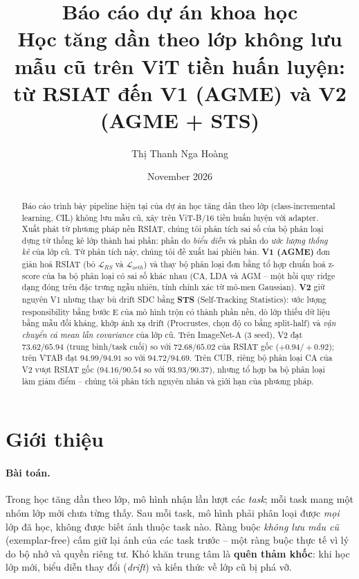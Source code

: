 \documentclass[11pt]{article}
\title{Báo cáo dự án khoa học\\[4pt]
\large Học tăng dần theo lớp không lưu mẫu cũ trên ViT tiền huấn luyện:\\
từ RSIAT đến V1 (AGME) và V2 (AGME + STS)}
\author{Thị Thanh Nga Hoàng}
\date{November 2026}
\begin{document}
\maketitle

\begin{abstract}
Báo cáo trình bày pipeline hiện tại của dự án học tăng dần theo lớp (class-incremental learning, CIL) không lưu mẫu
cũ, xây trên ViT-B/16 tiền huấn luyện với adapter. Xuất phát từ phương pháp nền RSIAT, chúng tôi phân tích sai số của
bộ phân loại dựng từ thống kê lớp thành hai phần: phần do \emph{biểu diễn} và phần do \emph{ước lượng thống kê} của lớp
cũ. Từ phân tích này, chúng tôi đề xuất hai phiên bản. \textbf{V1 (AGME)} đơn giản hoá RSIAT (bỏ $\mathcal{L}_{RS}$ và
$\mathcal{L}_{orth}$) và thay bộ phân loại đơn bằng tổ hợp chuẩn hoá z-score của ba bộ phân loại có sai số khác nhau
(CA, LDA và AGM -- một hồi quy ridge dạng đóng trên đặc trưng ngẫu nhiên, tính chính xác từ mô-men Gaussian).
\textbf{V2} giữ nguyên V1 nhưng thay bù drift SDC bằng \textbf{STS} (Self-Tracking Statistics): ước lượng
responsibility bằng bước E của mô hình trộn có thành phần nền, dò lớp thiếu dữ liệu bằng mẫu đối kháng, khớp ánh xạ
drift (Procrustes, chọn độ co bằng split-half) và \emph{vận chuyển cả mean lẫn covariance} của lớp cũ. Trên
ImageNet-A (3 seed), V2 đạt $73.62/65.94$ (trung bình/task cuối) so với $72.68/65.02$ của RSIAT gốc
($+0.94/+0.92$); trên VTAB đạt $94.99/94.91$ so với $94.72/94.69$. Trên CUB, riêng bộ phân loại CA của V2 vượt RSIAT
gốc ($94.16/90.54$ so với $93.93/90.37$), nhưng tổ hợp ba bộ phân loại làm giảm điểm -- chúng tôi phân tích nguyên
nhân và giới hạn của phương pháp.
\end{abstract}

\tableofcontents
\newpage

\section{Giới thiệu}

\paragraph{Bài toán.} Trong học tăng dần theo lớp, mô hình nhận lần lượt các \emph{task}; mỗi task mang một nhóm lớp
mới chưa từng thấy. Sau mỗi task, mô hình phải phân loại được \emph{mọi} lớp đã học, không được biết ảnh thuộc task
nào. Ràng buộc \emph{không lưu mẫu cũ} (exemplar-free) cấm giữ lại ảnh của các task trước -- một ràng buộc thực tế vì
lý do bộ nhớ và quyền riêng tư. Khó khăn trung tâm là \textbf{quên thảm khốc}: khi học lớp mới, biểu diễn thay đổi
(\emph{drift}) và kiến thức về lớp cũ bị phá vỡ.
\end{document}
